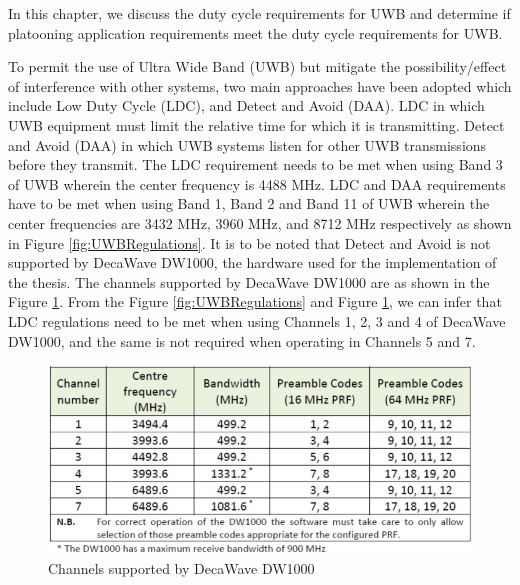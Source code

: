 
In this chapter, we discuss the duty cycle requirements for UWB and determine if platooning application requirements meet the duty cycle requirements for UWB.

To permit the use of Ultra Wide Band (UWB) but mitigate the possibility/effect of interference with other systems, two main approaches have been adopted which include Low Duty Cycle (LDC), and Detect and Avoid (DAA). LDC in which UWB equipment must limit the relative time for which it is transmitting. Detect and Avoid (DAA) in which UWB systems listen for other UWB transmissions before they transmit. The LDC requirement needs to be met when using Band 3 of UWB wherein the center frequency is 4488 MHz. LDC and DAA requirements have to be met when using Band 1, Band 2 and Band 11 of UWB wherein the center frequencies are 3432 MHz, 3960 MHz, and 8712 MHz respectively as shown in Figure \ref{fig:UWBRegulations}. It is to be noted that Detect and Avoid is not supported by DecaWave DW1000, the hardware used for the implementation of the thesis. The channels supported by DecaWave DW1000 are as shown in the Figure \ref{fig:ChannelsDecawaveDW1000}.
From the Figure \ref{fig:UWBRegulations} and Figure \ref{fig:ChannelsDecawaveDW1000}, we can infer that LDC regulations need to be met when using Channels 1, 2, 3 and 4 of DecaWave DW1000, and the same is not required when operating in Channels 5 and 7.
\begin{figure}[htbp]
    \begin{center}
        \includegraphics[width=1\textwidth]{figures/Picture2.png}
        \caption[Channels supported by DecaWave DW1000]{Channels supported by DecaWave DW1000 \protect\cite{DW1000UserManual}}
        \label{fig:ChannelsDecawaveDW1000}
    \end{center}
\end{figure}

